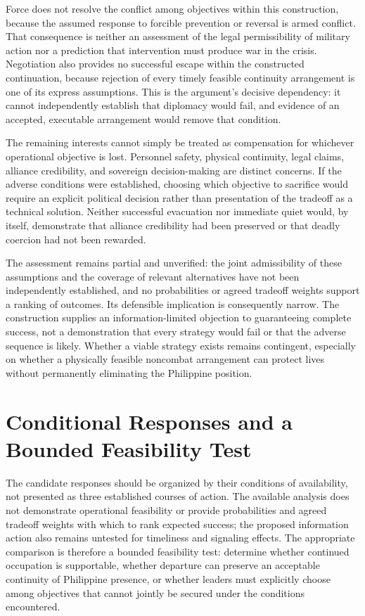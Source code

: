 \documentclass[11pt]{article}
\begin{document}
Force does not resolve the conflict among objectives within this construction, because the assumed response to forcible prevention or reversal is armed conflict. That consequence is neither an assessment of the legal permissibility of military action nor a prediction that intervention must produce war in the crisis. Negotiation also provides no successful escape within the constructed continuation, because rejection of every timely feasible continuity arrangement is one of its express assumptions. This is the argument’s decisive dependency: it cannot independently establish that diplomacy would fail, and evidence of an accepted, executable arrangement would remove that condition.

The remaining interests cannot simply be treated as compensation for whichever operational objective is lost. Personnel safety, physical continuity, legal claims, alliance credibility, and sovereign decision-making are distinct concerns. If the adverse conditions were established, choosing which objective to sacrifice would require an explicit political decision rather than presentation of the tradeoff as a technical solution. Neither successful evacuation nor immediate quiet would, by itself, demonstrate that alliance credibility had been preserved or that deadly coercion had not been rewarded.

The assessment remains partial and unverified: the joint admissibility of these assumptions and the coverage of relevant alternatives have not been independently established, and no probabilities or agreed tradeoff weights support a ranking of outcomes. Its defensible implication is consequently narrow. The construction supplies an information-limited objection to guaranteeing complete success, not a demonstration that every strategy would fail or that the adverse sequence is likely. Whether a viable strategy exists remains contingent, especially on whether a physically feasible noncombat arrangement can protect lives without permanently eliminating the Philippine position.

\section{Conditional Responses and a Bounded Feasibility Test}
The candidate responses should be organized by their conditions of availability, not presented as three established courses of action. The available analysis does not demonstrate operational feasibility or provide probabilities and agreed tradeoff weights with which to rank expected success; the proposed information action also remains untested for timeliness and signaling effects. The appropriate comparison is therefore a bounded feasibility test: determine whether continued occupation is supportable, whether departure can preserve an acceptable continuity of Philippine presence, or whether leaders must explicitly choose among objectives that cannot jointly be secured under the conditions encountered.
\end{document}
